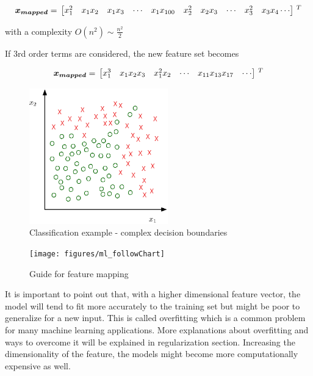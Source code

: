 \begin{equation}{\label{eqn:featureMapping3}}
\bm{x_{mapped}}
=\,
\begin{bmatrix}
x_1^2 & x_1x_2 & x_1x_3 & \cdots & x_1x_{100} & x_2^2 & x_2x_3 & \cdots & x_3^2 & x_3x_4  \cdots  
\end{bmatrix}
\,^ T
\end{equation} 

with a complexity $O(n^2) \sim \frac{n^2}{2}$

If 3rd order terms are considered, the new feature set becomes

\begin{equation}{\label{eqn:featureMapping4}}
\bm{x_{mapped}}
=\,
\begin{bmatrix}
x_1^3 & x_1x_2x_3 & x_1^2x_2 & \cdots  & x_{11}x_{13}x_{17} & \cdots  
\end{bmatrix}
\,^ T
\end{equation} 

\begin{figure}
\begin{center}
\includegraphics[width=6cm]{figures/complexDecisionBoundary}    %
\caption{Classification example - complex decision boundaries} 
\label{fig:complexBoundary}
\end{center}
\end{figure}

\begin{figure}
\begin{center}
\texttt{[image: figures/ml\_followChart]}    %
\caption{Guide for feature mapping} 
\label{fig:ml_followChart}
\end{center}
\end{figure}


It is important to point out that, with a higher dimensional feature vector, the model will tend to fit more accurately to the training set but might be poor to generalize for a new input. 
This is called overfitting which is a common problem for many machine learning applications. 
More explanations about overfitting and ways to overcome it will be explained in regularization section. Increasing the dimensionality of the feature, the models might become more computationally expensive as well.

